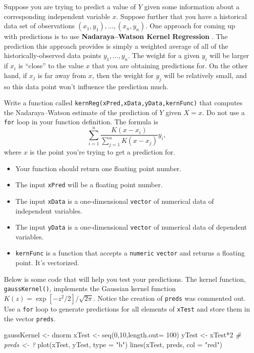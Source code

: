 \documentclass[
  12pt,
  krantz2]{krantz}
\makeatletter
\newenvironment{Shaded}{\begin{snugshade}}{\end{snugshade}}
\newcommand{\AttributeTok}[1]{\textcolor[rgb]{0.61,0.61,0.61}{#1}}
\newcommand{\CommentTok}[1]{\textcolor[rgb]{0.37,0.37,0.37}{\textit{#1}}}
\newcommand{\DecValTok}[1]{\textcolor[rgb]{0.06,0.06,0.06}{#1}}
\newcommand{\FunctionTok}[1]{\textcolor[rgb]{0,0,0}{#1}}
\newcommand{\NormalTok}[1]{#1}
\newcommand{\OtherTok}[1]{\textcolor[rgb]{0.37,0.37,0.37}{#1}}
\newcommand{\SpecialCharTok}[1]{\textcolor[rgb]{0,0,0}{#1}}
\newcommand{\StringTok}[1]{\textcolor[rgb]{0.5,0.5,0.5}{#1}}
\providecommand{\tightlist}{%
  \setlength{\itemsep}{0pt}\setlength{\parskip}{0pt}}
\newenvironment{kframe}{%
\medskip{}
\setlength{\fboxsep}{.8em}
 \def\at@end@of@kframe{}%
 \ifinner\ifhmode%
  \def\at@end@of@kframe{\end{minipage}}%
  \begin{minipage}{\columnwidth}%
 \fi\fi%
 \def\FrameCommand##1{\hskip\@totalleftmargin \hskip-\fboxsep
 \colorbox{shadecolor}{##1}\hskip-\fboxsep
     \hskip-\linewidth \hskip-\@totalleftmargin \hskip\columnwidth}%
 \MakeFramed {\advance\hsize-\width
   \@totalleftmargin\z@ \linewidth\hsize
   \@setminipage}}%
 {\par\unskip\endMakeFramed%
 \at@end@of@kframe}
\renewenvironment{Shaded}{\begin{kframe}}{\end{kframe}}
\makeatother
\begin{document}
Suppose you are trying to predict a value of \(Y\) given some information about a corresponding independent variable \(x\). Suppose further that you have a historical data set of observations \((x_1, y_1), \ldots, (x_n,y_n)\). One approach for coming up with predictions is to use \textbf{Nadaraya--Watson Kernel Regression} \citep{Nadaraya} \citep{Watson}. The prediction this approach provides is simply a weighted average of all of the historically-observed data points \(y_1, \ldots, y_n\). The weight for a given \(y_i\) will be larger if \(x_i\) is ``close'' to the value \(x\) that you are obtaining predictions for. On the other hand, if \(x_j\) is far away from \(x\), then the weight for \(y_j\) will be relatively small, and so this data point won't influence the prediction much.

Write a function called \texttt{kernReg(xPred,xData,yData,kernFunc)} that computes the Nadaraya--Watson estimate of the prediction of \(Y\) given \(X=x\). Do not use a \texttt{for} loop in your function definition. The formula is
\[\sum_{i=1}^n \frac{K(x-x_i)}{\sum_{j=1}^n K(x-x_j) } y_i,\] where \(x\) is the point you're trying to get a prediction for.

\begin{itemize}
\tightlist
\item
  Your function should return one floating point number.
\item
  The input \texttt{xPred} will be a floating point number.
\item
  The input \texttt{xData} is a one-dimensional \texttt{vector} of numerical data of independent variables.
\item
  The input \texttt{yData} is a one-dimensional \texttt{vector} of numerical data of dependent variables.
\item
  \texttt{kernFunc} is a function that accepts a \texttt{numeric} \texttt{vector} and returns a floating point. It's vectorized.
\end{itemize}

Below is some code that will help you test your predictions. The kernel function, \texttt{gaussKernel()}, implements the Gaussian kernel function \(K(z) = \exp[-z^2/2]/\sqrt{2\pi}\). Notice the creation of \texttt{preds} was commented out. Use a \texttt{for} loop to generate predictions for all elements of \texttt{xTest} and store them in the vector \texttt{preds}.

\begin{Shaded}
\begin{Highlighting}[]
\NormalTok{gaussKernel }\OtherTok{\textless{}{-}}\NormalTok{ dnorm}
\NormalTok{xTest }\OtherTok{\textless{}{-}} \FunctionTok{seq}\NormalTok{(}\DecValTok{0}\NormalTok{,}\DecValTok{10}\NormalTok{,}\AttributeTok{length.out=} \DecValTok{100}\NormalTok{)}
\NormalTok{yTest }\OtherTok{\textless{}{-}}\NormalTok{ xTest}\SpecialCharTok{*}\DecValTok{2} 
\CommentTok{\# preds \textless{}{-} ?}
\FunctionTok{plot}\NormalTok{(xTest, yTest, }\AttributeTok{type =} \StringTok{"b"}\NormalTok{)}
\FunctionTok{lines}\NormalTok{(xTest, preds, }\AttributeTok{col =} \StringTok{"red"}\NormalTok{)}
\end{Highlighting}
\end{Shaded}
\end{document}
